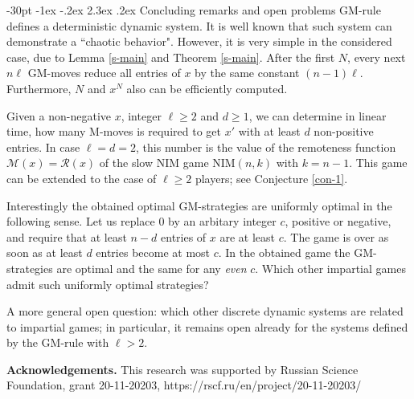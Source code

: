 \documentclass[10pt]{article}
\makeatletter
\renewcommand\section{\@startsection {section}{1}{\z@}
{-30pt \@plus -1ex \@minus -.2ex}
{2.3ex \@plus.2ex}
{\normalfont\normalsize\bfseries\boldmath}}
\theoremstyle{definition}
\def\R{\mathcal{R}}
\def\M{\mathcal{M}}
\makeatother
\begin{document}
\section{Concluding remarks and open problems} 
GM-rule defines a deterministic dynamic system. 
It is well known that such system can demonstrate 
a ``chaotic behavior". 
However, it is very simple in the considered case, 
due to Lemma \ref{s-main} and Theorem \ref{s-main}.  
After the first $N$, every next $n \ell$  GM-moves  
reduce all entries of $x$  by the same constant $(n-1)\ell$.  
Furthermore, $N$ and $x^N$  also can be efficiently computed.

Given a non-negative $x$, 
integer $\ell \geq 2$ and $d \geq 1$,  
we can determine in linear time, 
how many M-moves is required to get 
$x'$  with at least $d$  non-positive entries. 
In case $\ell=d=2$, this number 
is the value of the remoteness function  $\M(x) = \R(x)$ 
of the slow NIM game NIM$(n,k)$  with $k=n-1$.   
This game can be extended to the case of $\ell \geq 2$ players; 
see Conjecture \ref{con-1}.

Interestingly the obtained optimal GM-strategies 
are uniformly optimal in the following sense. 
Let us replace  0  by an arbitary 
integer $c$, positive or negative, and  
require that at least  $n - d$ entries of  $x$ are at least $c$. 
The game is over as soon as at least 
$d$  entries become at most  $c$. 
In the obtained game 
the GM-strategies are optimal and 
the same for any {\em even} $c$. 
Which other impartial games admit such 
uniformly optimal strategies? 

A more general open question:     
which other discrete dynamic systems 
are related to impartial games;  
in particular, it remains open 
already for the systems defined 
by the GM-rule with $\ell > 2$. 

\bigskip 

\noindent 
{\bf Acknowledgements.}
This research was supported by Russian Science Foundation, 
grant 20-11-20203, https://rscf.ru/en/project/20-11-20203/
\end{document}
